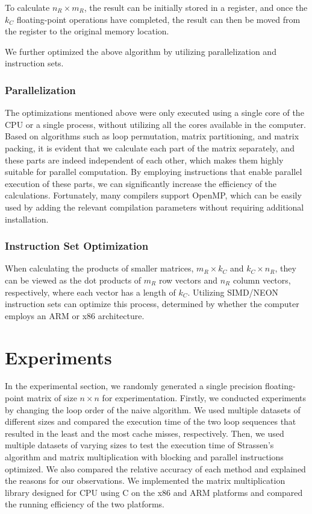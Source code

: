 \documentclass[conference]{IEEEtran}
\begin{document}
	To calculate $n_R \times m_R$, the result can be initially stored in a register, and once the $k_C$ floating-point operations have completed, the result can then be moved from the register to the original memory location.
	
	We further optimized the above algorithm by utilizing parallelization and instruction sets.
	
	\subsubsection{Parallelization}
	The optimizations mentioned above were only executed using a single core of the CPU or a single process, without utilizing all the cores available in the computer. Based on algorithms such as loop permutation, matrix partitioning, and matrix packing, it is evident that we calculate each part of the matrix separately, and these parts are indeed independent of each other, which makes them highly suitable for parallel computation. By employing instructions that enable parallel execution of these parts, we can significantly increase the efficiency of the calculations. Fortunately, many compilers support OpenMP, which can be easily used by adding the relevant compilation parameters without requiring additional installation.
	\subsubsection{Instruction Set Optimization}
	When calculating the products of smaller matrices, $m_R \times k_C$ and $k_C \times n_R$, they can be viewed as the dot products of $m_R$ row vectors and $n_R$ column vectors, respectively, where each vector has a length of $k_C$. Utilizing SIMD/NEON instruction sets can optimize this process, determined by whether the computer employs an ARM or x86 architecture.
	
	
	\section{Experiments}
	
	In the experimental section, we randomly generated a single precision floating-point matrix of size $n \times n$ for experimentation. Firstly, we conducted experiments by changing the loop order of the naive algorithm. We used multiple datasets of different sizes and compared the execution time of the two loop sequences that resulted in the least and the most cache misses, respectively. Then, we used multiple datasets of varying sizes to test the execution time of Strassen's algorithm and matrix multiplication with blocking and parallel instructions optimized. We also compared the relative accuracy of each method and explained the reasons for our observations. We implemented the matrix multiplication library designed for CPU using C on the x86 and ARM platforms and compared the running efficiency of the two platforms.
	
\end{document}
